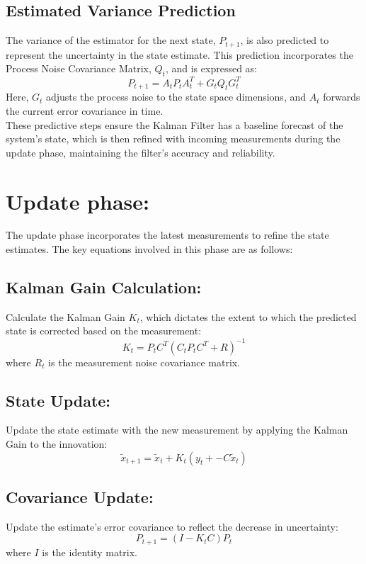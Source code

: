 \documentclass{article}
\begin{document}
\subsection{Estimated Variance Prediction}
The variance of the estimator for the next state, \( P_{t+1} \), is also predicted to represent the uncertainty in the state estimate. This prediction incorporates the Process Noise Covariance Matrix, \( Q_t \), and is expressed as:
\[
P_{t+1} = A_t P_t A_t^T + G_t Q_t G_t^T
\]
Here, \( G_t \) adjusts the process noise to the state space dimensions, and \( A_t \) forwards the current error covariance in time.
\\

\noindent
These predictive steps ensure the Kalman Filter has a baseline forecast of the system's state, which is then refined with incoming measurements during the update phase, maintaining the filter's accuracy and reliability.

\section{Update phase:}

The update phase incorporates the latest measurements to refine the state estimates. The key equations involved in this phase are as follows:


\subsection{Kalman Gain Calculation:}
Calculate the Kalman Gain \( K_t \), which dictates the extent to which the predicted state is corrected based on the measurement:
\[ K_t = P_{t} C^T (C_t P_t C^T + R)^{-1} \]
where \( R_t \) is the measurement noise covariance matrix.

\subsection{State Update:}
Update the state estimate with the new measurement by applying the Kalman Gain to the innovation:
\[ \widetilde{x}_{t+1} = \widetilde{x}_{t} + K_t ( y_t + - C\widetilde{x}_t)\]

\subsection{Covariance Update:}Update the estimate's error covariance to reflect the decrease in uncertainty:
\[ P_{t+1} = (I - K_t C) P_{t} \]
where \( I \) is the identity matrix.
\end{document}
